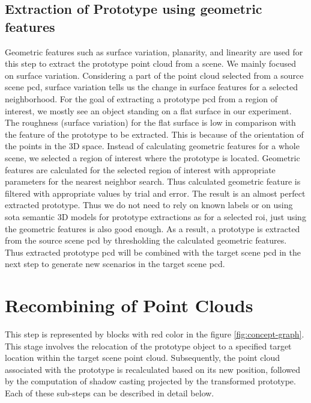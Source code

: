 \subsection{Extraction of Prototype using geometric features}
Geometric features such as surface variation, planarity, and linearity are used for this step to extract the prototype point cloud from a scene. We mainly focused on surface variation. Considering a part of the point cloud selected from a source scene \acrshort{pcd}, surface variation tells us the change in surface features for a selected neighborhood. For the goal of extracting a prototype \acrshort{pcd} from a region of interest, we mostly see an object standing on a flat surface in our experiment. The roughness (surface variation) for the flat surface is low in comparison with the feature of the prototype to be extracted. This is because of the orientation of the points in the 3D space. Instead of calculating geometric features for a whole scene, we selected a region of interest where the prototype is located. Geometric features are calculated for the selected region of interest with appropriate parameters for the nearest neighbor search. Thus calculated geometric feature is filtered with appropriate values by trial and error. The result is an almost perfect extracted prototype. Thus we do not need to rely on known labels or on using \acrshort{sota} semantic 3D models for prototype extractions as for a selected \acrfull{roi}, just using the geometric features is also good enough. As a result, a prototype is extracted from the source scene \acrshort{pcd} by thresholding the calculated geometric features. Thus extracted prototype \acrshort{pcd} will be combined with the target scene \acrshort{pcd} in the next step to generate new scenarios in the target scene \acrshort{pcd}.

\section{Recombining of Point Clouds}
This step is represented by blocks with red color in the figure \ref{fig:concept-graph}. This stage involves the relocation of the prototype object to a specified target location within the target scene point cloud. Subsequently, the point cloud associated with the prototype is recalculated based on its new position, followed by the computation of shadow casting projected by the transformed prototype. Each of these sub-steps can be described in detail below.

